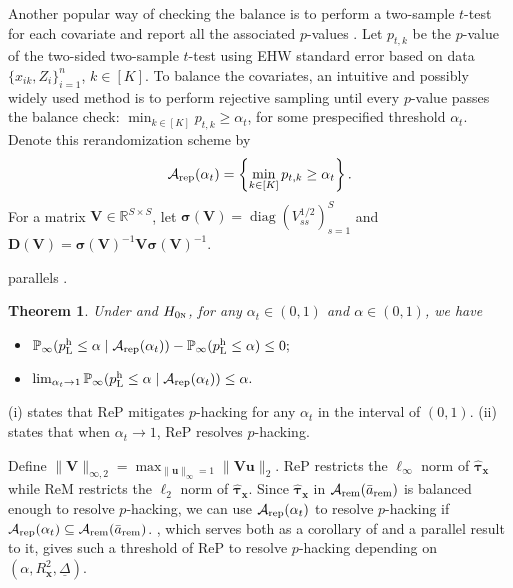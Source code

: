 \documentclass[12pt]{article}
\newtheorem{theorem}{Theorem}
\newcommand{\Prob}{\mathbb{P}}
\newcommand{\diag}{\operatorname{diag}}
\newcommand{\ma}{\mathcal{A}}
\newcommand{\rem}{\textnormal{rem}}
\newcommand{\rep}{\textnormal{rep}}
\newcommand{\bs}{\boldsymbol}
\newcommand{\pinf}{\mathbb{P}_\infty}
\newcommand{\hpL}{p_\textnormal{L}^{\textnormal{h}}}
\begin{document}
Another popular way of checking the balance is to perform a two-sample $t$-test for each covariate and report all the associated $p$-values \citep{zdrep,bruhn2009pursuit,gerber2012field}. Let $p_{t,k}$ be the $p$-value of the two-sided two-sample $t$-test using EHW standard error based on data $\{x_{ik},Z_i\}_{i=1}^n$, $k\in [K]$. To balance the covariates, an intuitive and possibly widely used method is to perform rejective sampling until every $p$-value passes the balance check: $\min_{k\in [K]} p_{t,k}\geq \alpha_t$, for some prespecified threshold $\alpha_t$. Denote this rerandomization scheme by $$\ma_\rep(\alpha_t) = \left\{\min_{k\in [K]} p_{t,k}\geq \alpha_t \right\}.$$  For a matrix $\bs{V}\in \mathbb{R}^{S\times S}$, let $\bs{\sigma}(\bs{V}) = \diag(V_{ss}^{1/2})_{s=1}^S$ and $\bs{D}(\bs{V}) = \bs{\sigma}(\bs{V})^{-1}\bs{V}\bs{\sigma}(\bs{V})^{-1}$.

 parallels .
\begin{theorem}
    \label{thm:rep-mitigates-p-hacking}
    Under  and $H_{0\textsc{n}}$, for any $\alpha_t \in (0,1)$ and $\alpha \in (0,1)$, we have
    \begin{itemize}
        \item[(i)]  $\pinf( \hpL \leq \alpha\mid \ma_\rep(\alpha_t)) -\pinf( \hpL \leq \alpha) \leq 0;$
        \item[(ii)]  $\lim_{\alpha_t\rightarrow 1}\Prob_{\infty}(\hpL \leq \alpha  \mid \ma_{\rep}(\alpha_t)) \leq \alpha.$ 
    \end{itemize}
\end{theorem}

 (i) states that ReP mitigates $p$-hacking for any $\alpha_t$ in the interval of $(0, 1)$.  (ii) states that when $\alpha_t\rightarrow 1$, ReP resolves $p$-hacking.

Define $\lVert\bs{V}\lVert_{\infty,2} = \max_{\lVert\bs{u}\lVert_\infty=1}\lVert\bs{V}\bs{u}\lVert_2$. 
ReP restricts the $\ell_\infty$ norm of $\hat{\bs{\tau}}_{\bs{x}}$ while ReM restricts the $\ell_2$ norm of $\hat{\bs{\tau}}_{\bs{x}}$. Since $\hat{\bs{\tau}}_{\bs{x}}$ in $\ma_{\rem}(\bar{a}_{\rem})$ is balanced enough to resolve $p$-hacking, we can use $\ma_{\rep}(\alpha_t)$ to resolve $p$-hacking  if $\ma_{\rep}(\alpha_t)\subseteq \ma_{\rem}(\bar{a}_{\rem})$. , which serves
both as a corollary of  and a parallel result to it, gives such a threshold of ReP to resolve $p$-hacking depending on $(\alpha,R^2_{\bs{x}}, \underline{\Delta})$. 
\end{document}
